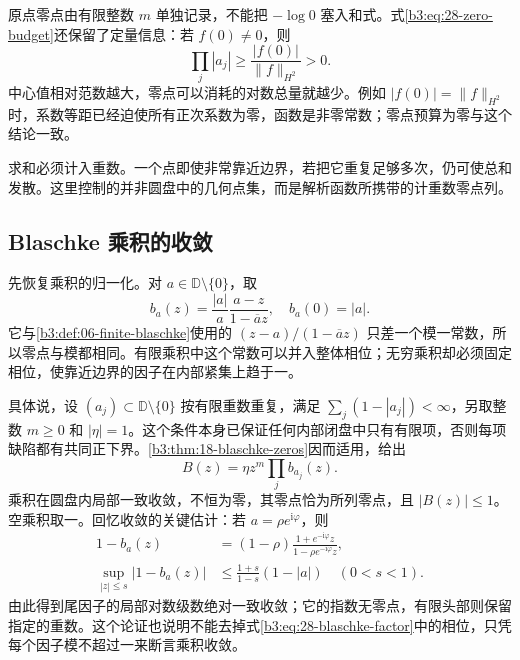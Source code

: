 原点零点由有限整数 \(m\) 单独记录，不能把 \(-\log0\) 塞入和式。式\eqref{b3:eq:28-zero-budget}还保留了定量信息：若 \(f(0)\ne0\)，则
\[
 \prod_j|a_j|\ge\frac{|f(0)|}{\|f\|_{H^2}}>0.
\]
中心值相对范数越大，零点可以消耗的对数总量就越少。例如 \(|f(0)|=\|f\|_{H^2}\) 时，系数等距已经迫使所有正次系数为零，函数是非零常数；零点预算为零与这个结论一致。

\ProseParagraphBreak

求和必须计入重数。一个点即使非常靠近边界，若把它重复足够多次，仍可使总和发散。这里控制的并非圆盘中的几何点集，而是解析函数所携带的计重数零点列。

\subsection{Blaschke 乘积的收敛}
\label{b3:subsec:280302}

先恢复乘积的归一化。对 \(a\in\mathbb D\setminus\{0\}\)，取
\begin{equation}\label{b3:eq:28-blaschke-factor}
 b_a(z)=\frac{|a|}{a}\frac{a-z}{1-\overline a z},
 \quad b_a(0)=|a|.
\end{equation}
它与\cref{b3:def:06-finite-blaschke}使用的 \((z-a)/(1-\overline a z)\) 只差一个模一常数，所以零点与模都相同。有限乘积中这个常数可以并入整体相位；无穷乘积却必须固定相位，使靠近边界的因子在内部紧集上趋于一。

\ProseParagraphBreak

具体说，设 \((a_j)\subset\mathbb D\setminus\{0\}\) 按有限重数重复，满足 \(\sum_j(1-|a_j|)<\infty\)，另取整数 \(m\ge0\) 和 \(|\eta|=1\)。这个条件本身已保证任何内部闭盘中只有有限项，否则每项缺陷都有共同正下界。\cref{b3:thm:18-blaschke-zeros}因而适用，给出
\begin{equation}\label{b3:eq:28-blaschke-product}
 B(z)=\eta z^m\prod_j b_{a_j}(z).
\end{equation}
乘积在圆盘内局部一致收敛，不恒为零，其零点恰为所列零点，且 \(|B(z)|\le1\)。空乘积取一。回忆收敛的关键估计：若 \(a=\rho e^{\mathrm i\varphi}\)，则
\[
 \begin{aligned}
 1-b_a(z)&=(1-\rho)\frac{1+e^{-\mathrm i\varphi}z}
                              {1-\rho e^{-\mathrm i\varphi}z},\\
 \sup_{|z|\le s}|1-b_a(z)|&\le\frac{1+s}{1-s}(1-|a|)
 \quad(0<s<1).
 \end{aligned}
\]
由此得到尾因子的局部对数级数绝对一致收敛；它的指数无零点，有限头部则保留指定的重数。这个论证也说明不能去掉式\eqref{b3:eq:28-blaschke-factor}中的相位，只凭每个因子模不超过一来断言乘积收敛。

